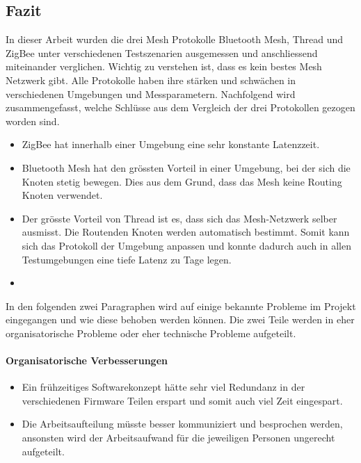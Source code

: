 \newpage
\subsection{Fazit}\label{subsec:Fazit}
In dieser Arbeit wurden die drei Mesh Protokolle Bluetooth Mesh, Thread und ZigBee unter verschiedenen Testszenarien ausgemessen und anschliessend miteinander verglichen. Wichtig zu verstehen ist, dass es kein bestes Mesh Netzwerk gibt. Alle Protokolle haben ihre stärken und schwächen in verschiedenen Umgebungen und Messparametern. Nachfolgend wird zusammengefasst, welche Schlüsse aus dem Vergleich der drei Protokollen gezogen worden sind.

\begin{itemize}
	\item ZigBee hat innerhalb einer Umgebung eine sehr konstante Latenzzeit.
	\item Bluetooth Mesh hat den grössten Vorteil in einer Umgebung, bei der sich die Knoten stetig bewegen. Dies aus dem Grund, dass das Mesh keine Routing Knoten verwendet.
	\item Der grösste Vorteil von Thread ist es, dass sich das Mesh-Netzwerk selber ausmisst. Die Routenden Knoten werden automatisch bestimmt. Somit kann sich das Protokoll der Umgebung anpassen und konnte dadurch auch in allen Testumgebungen eine tiefe Latenz zu Tage legen.
	\item {}
\end{itemize}

In den folgenden zwei Paragraphen wird auf einige bekannte Probleme im Projekt eingegangen und wie diese behoben werden können. Die zwei Teile werden in eher organisatorische Probleme oder eher technische Probleme aufgeteilt.

\paragraph{Organisatorische Verbesserungen}\label{par:Organisatorische_Verbesserungen}
\begin{itemize}
	\item Ein frühzeitiges Softwarekonzept hätte sehr viel Redundanz in der verschiedenen Firmware Teilen erspart und somit auch viel Zeit eingespart.
	\item Die Arbeitsaufteilung müsste besser kommuniziert und besprochen werden, ansonsten wird der Arbeitsaufwand für die jeweiligen Personen ungerecht aufgeteilt.
\end{itemize}

